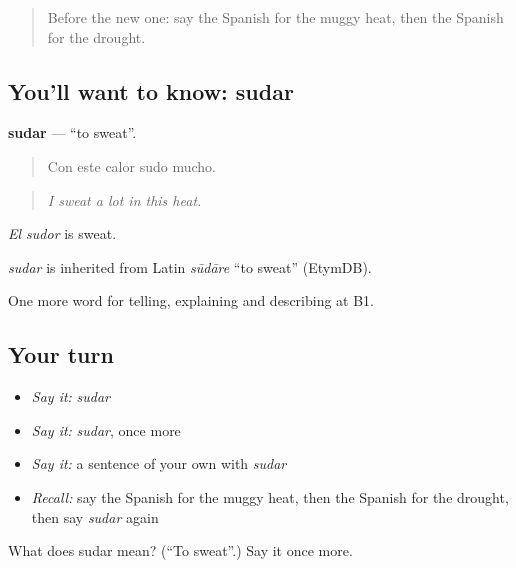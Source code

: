 \label{lesson:ES-C701-sudar}



\begin{quote}
Before the new one: say the Spanish for the muggy heat, then the Spanish for the drought.
\end{quote}

\subsection*{You'll want to know: sudar}
\textbf{sudar} — \textquotedblleft{}to sweat\textquotedblright{}.

\begin{quote}
Con este calor sudo mucho.
\end{quote}

\begin{quote}
\emph{I sweat a lot in this heat.}
\end{quote}

\emph{El sudor} is sweat.

\begin{cousinweb}
\emph{sudar} is inherited from Latin \emph{sūdāre} \textquotedblleft{}to sweat\textquotedblright{} (EtymDB).
\end{cousinweb}

\begin{grammarlens}[title={What you've built}]
One more word for telling, explaining and describing at B1.
\end{grammarlens}

\subsection*{Your turn}
\begin{itemize}
\raggedright
  \item \emph{Say it:} \emph{sudar}
  \item \emph{Say it:} \emph{sudar}, once more
  \item \emph{Say it:} a sentence of your own with \emph{sudar}
  \item \emph{Recall:} say the Spanish for the muggy heat, then the Spanish for the drought, then say \emph{sudar} again
\end{itemize}

\begin{tcolorbox}[breakable,colback=teal!4,colframe=teal!35!black,title={Before you move on}]
What does sudar mean? (\textquotedblleft{}To sweat\textquotedblright{}.) Say it once more.
\end{tcolorbox}
